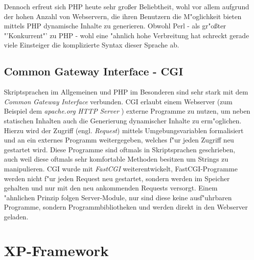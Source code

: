 Dennoch erfreut sich PHP heute sehr gro\ss er Beliebtheit, wohl vor allem aufgrund der hohen Anzahl von Webservern,
die ihren Benutzern die M"oglichkeit bieten mittels PHP dynamische Inhalte zu generieren. Obwohl Perl -
als gr"o\ss ter "'Konkurrent"' zu PHP - 
wohl eine "ahnlich hohe Verbreitung hat schreckt gerade viele Einsteiger die komplizierte Syntax dieser Sprache ab.


\subsection{Common Gateway Interface - CGI}
\label{sec:background:cgi}

Skriptsprachen im Allgemeinen und PHP im Besonderen sind sehr stark mit dem \emph{Common Gateway Interface} verbunden.
CGI erlaubt einem Webserver (zum Beispiel dem \emph{apache.org HTTP Server} \cite{APACHEHP}) externe Programme zu nutzen, um
neben statischen Inhalten auch die Generierung dynamischer Inhalte zu erm"oglichen. 
Hierzu wird der Zugriff (engl. \emph{Request}) mittels
Umgebungsvariablen formalisiert und an ein externes Programm weitergegeben, welches f"ur jeden Zugriff neu gestartet wird.
Diese Programme sind oftmals in Skriptsprachen geschrieben, 
auch weil diese oftmals sehr komfortable Methoden besitzen um Strings zu manipulieren.
CGI wurde mit \emph{FastCGI} weiterentwickelt, FastCGI-Programme werden nicht f"ur jeden Request neu gestartet, sondern werden
im Speicher gehalten und nur mit den neu ankommenden Requests versorgt. Einem "ahnlichen Prinzip folgen Server-Module, nur sind
diese keine ausf"uhrbaren Programme, sondern Programmbibliotheken und werden direkt in den Webserver geladen.

\section{XP-Framework}
\label{sec:background:xp}

